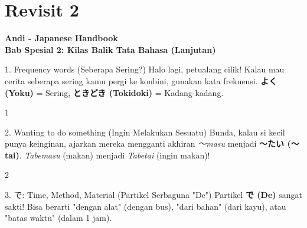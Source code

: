﻿\chapter{Revisit 2}

\begin{center}
    {\Huge \bfseries Andi - Japanese Handbook}\\[0.5em]
    {\LARGE \color{boxframe} \textbf{Bab Spesial 2: Kilas Balik Tata Bahasa (Lanjutan)}}
\end{center}
\vspace{1em}

\begin{lessonbox}{1. Frequency words (Seberapa Sering?)}
    Halo lagi, petualang cilik! Kalau mau cerita seberapa sering kamu pergi ke konbini, gunakan kata frekuensi. \textbf{よく (Yoku)} = Sering, \textbf{ときどき (Tokidoki)} = Kadang-kadang.
\end{lessonbox}
\begin{convobox}{1}
    \noindent
      
      

    \vspace{1.5em}
\end{convobox}

\begin{lessonbox}{2. Wanting to do something (Ingin Melakukan Sesuatu)}
    Bunda, kalau si kecil punya keinginan, ajarkan mereka mengganti akhiran \textit{〜masu} menjadi \textbf{〜たい (〜tai)}. \textit{Tabemasu} (makan) menjadi \textit{Tabetai} (ingin makan)!
\end{lessonbox}
\begin{convobox}{2}
    \noindent
      

    \vspace{1.5em}
\end{convobox}

\begin{lessonbox}{3. で: Time, Method, Material (Partikel Serbaguna "De")}
    Partikel \textbf{で (De)} sangat sakti! Bisa berarti "dengan alat" (dengan bus), "dari bahan" (dari kayu), atau "batas waktu" (dalam 1 jam).
\end{lessonbox}

